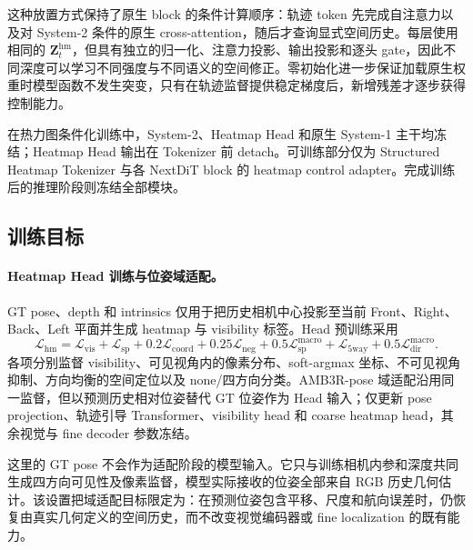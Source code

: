 \documentclass[10pt]{ctexart}
\begin{document}
这种放置方式保持了原生 block 的条件计算顺序：轨迹 token 先完成自注意力以及对 System-2 条件的原生 cross-attention，随后才查询显式空间历史。每层使用相同的 $\mathbf{Z}^{\mathrm{hm}}_t$，但具有独立的归一化、注意力投影、输出投影和逐头 gate，因此不同深度可以学习不同强度与不同语义的空间修正。零初始化进一步保证加载原生权重时模型函数不发生突变，只有在轨迹监督提供稳定梯度后，新增残差才逐步获得控制能力。

在热力图条件化训练中，System-2、Heatmap Head 和原生 System-1 主干均冻结；Heatmap Head 输出在 Tokenizer 前 detach。可训练部分仅为 Structured Heatmap Tokenizer 与各 NextDiT block 的 heatmap control adapter。完成训练后的推理阶段则冻结全部模块。

\subsection{训练目标}

\paragraph{Heatmap Head 训练与位姿域适配。}
GT pose、depth 和 intrinsics 仅用于把历史相机中心投影至当前 Front、Right、Back、Left 平面并生成 heatmap 与 visibility 标签。Head 预训练采用
\begin{equation}
  \mathcal{L}_{\mathrm{hm}}
  =\mathcal{L}_{\mathrm{vis}}
  +\mathcal{L}_{\mathrm{sp}}
  +0.2\mathcal{L}_{\mathrm{coord}}
  +0.25\mathcal{L}_{\mathrm{neg}}
  +0.5\mathcal{L}_{\mathrm{sp}}^{\mathrm{macro}}
  +\mathcal{L}_{\mathrm{5way}}
  +0.5\mathcal{L}_{\mathrm{dir}}^{\mathrm{macro}}.
\end{equation}
各项分别监督 visibility、可见视角内的像素分布、soft-argmax 坐标、不可见视角抑制、方向均衡的空间定位以及 none/四方向分类。AMB3R-pose 域适配沿用同一监督，但以预测历史相对位姿替代 GT 位姿作为 Head 输入；仅更新 pose projection、轨迹引导 Transformer、visibility head 和 coarse heatmap head，其余视觉与 fine decoder 参数冻结。

这里的 GT pose 不会作为适配阶段的模型输入。它只与训练相机内参和深度共同生成四方向可见性及像素监督，模型实际接收的位姿全部来自 RGB 历史几何估计。该设置把域适配目标限定为：在预测位姿包含平移、尺度和航向误差时，仍恢复由真实几何定义的空间历史，而不改变视觉编码器或 fine localization 的既有能力。
\end{document}
